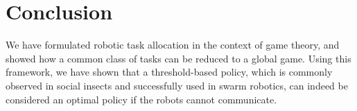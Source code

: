 \documentclass[conference]{ieeeconf}
\begin{document}
\section{Conclusion}\label{sec:conc}
We have formulated robotic task allocation in the context of game theory, and showed how a common class of tasks can be reduced to a global game. Using this framework, we have shown that a threshold-based policy, which is commonly observed in social insects and successfully used in swarm robotics, can indeed be considered an optimal policy if the robots cannot communicate. 




\end{document}

